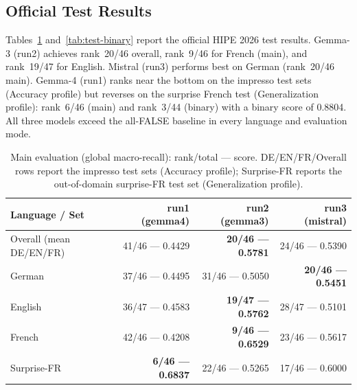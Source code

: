 \documentclass[
]{ceurart}
\theoremstyle{definition}
\begin{document}
\subsection{Official Test Results}

Tables~\ref{tab:test-main} and~\ref{tab:test-binary} report the official HIPE 2026 test results.
Gemma-3 (run2) achieves rank~20/46 overall, rank~9/46 for French (main), and rank~19/47 for English.
Mistral (run3) performs best on German (rank~20/46 main).
Gemma-4 (run1) ranks near the bottom on the impresso test sets (Accuracy profile) but reverses on the surprise French test (Generalization profile): rank~6/46 (main) and rank~3/44 (binary) with a binary score of 0.8804.
All three models exceed the all-FALSE baseline in every language and evaluation mode.

\begin{table}[t]
\centering
\caption{Main evaluation (global macro-recall): rank/total --- score. DE/EN/FR/Overall rows report the impresso test sets (Accuracy profile); Surprise-FR reports the out-of-domain surprise-FR test set (Generalization profile).}
\label{tab:test-main}
\setlength{\tabcolsep}{4pt}
\begin{tabular}{lrrr}
\toprule
\textbf{Language / Set} & \textbf{run1 (gemma4)} & \textbf{run2 (gemma3)} & \textbf{run3 (mistral)} \\
\midrule
Overall (mean DE/EN/FR) & 41/46 --- 0.4429 & \textbf{20/46 --- 0.5781} & 24/46 --- 0.5390 \\
German                  & 37/46 --- 0.4495 & 31/46 --- 0.5050          & \textbf{20/46 --- 0.5451} \\
English                 & 36/47 --- 0.4583 & \textbf{19/47 --- 0.5762} & 28/47 --- 0.5101 \\
French                  & 42/46 --- 0.4208 & \textbf{9/46 --- 0.6529}  & 23/46 --- 0.5617 \\
Surprise-FR             & \textbf{6/46 --- 0.6837}  & 22/46 --- 0.5265 & 17/46 --- 0.6000 \\
\bottomrule
\end{tabular}
\end{table}
\end{document}
